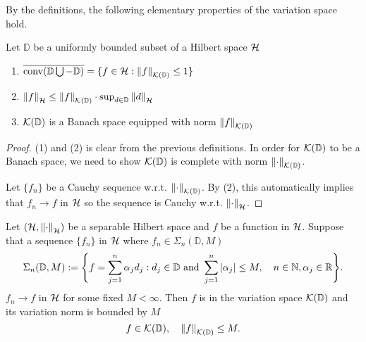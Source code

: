 By the definitions, the following elementary properties of the variation space
hold.
\begin{proposition}
    \label{prop:spaceVar_properties}
    Let $\mathbb{D}$ be a uniformly bounded subset of a Hilbert space $\mathcal{H}$
    \begin{enumerate}
        \item $\overline{\operatorname*{conv}(\mathbb{D} \bigcup - \mathbb{D})} = \{
            f\in\mathcal{H}: \left\| {f} \right\|_{\mathcal{K}({\mathbb{D}})} \leq 1
        \}$
        \item $\left\| f \right\|_{\mathcal{H}} \leq \left\| {f} \right\|_{\mathcal{K}({\mathbb{D}})} \cdot
        \sup_{d\in\mathbb{D}} \left\| d \right\|_{\mathcal{H}}$
        \item $\mathcal{K}({\mathbb{D}})$ is a Banach space equipped with norm
        $\left\| {f} \right\|_{\mathcal{K}({\mathbb{D}})}$
    \end{enumerate}
\end{proposition}

\begin{proof}
    (1) and (2) is clear from the previous definitions. In order for
    $\mathcal{K}({\mathbb{D}})$ to be a Banach space, we need to show
    $\mathcal{K}({\mathbb{D}})$ is complete with norm $\left\| {\cdot} \right\|_{\mathcal{K}({\mathbb{D}})}$.

    Let $\{f_n\}$ be a Cauchy sequence w.r.t. $\left\| {\cdot} \right\|_{\mathcal{K}({\mathbb{D}})}$. By
    (2), this automatically implies that $f_n \to f$ in $\mathcal{H}$ so the
    sequence is Cauchy w.r.t. $\left\| \cdot \right\|_{\mathcal{H}}$.
\end{proof}


\begin{proposition}
    Let $(\mathcal{H}, \left\| \cdot \right\|_{\mathcal{H}})$ be a separable Hilbert space and
    $f$ be a function in $\mathcal{H}$. Suppose that a sequence $\{f_n\}$ in
    $\mathcal{H}$ where $f_n \in \Sigma_{n}(\mathbb{D}, M)$
    \begin{equation}
        \Sigma_n(\mathbb{D}, M) := \Bigg\{
            f = \sum_{j=1}^n \alpha_j d_j: 
            d_j \in \mathbb{D} \textnormal{ and } 
            \sum_{j=1}^n \left| \alpha_j \right| \leq M, \quad 
            n \in \mathbb{N}, \alpha_j \in \mathbb{R}
        \Bigg\}.
    \end{equation}
    $f_n \to f$ in $\mathcal{H}$ for some fixed $M < \infty$. Then $f$ is in the
    variation space $\mathcal{K}({\mathbb{D}})$ and its variation norm is bounded by
    $M$
    \begin{equation}
        f \in \mathcal{K}({\mathbb{D}}), \quad \left\| {f} \right\|_{\mathcal{K}({\mathbb{D}})}\leq M.
    \end{equation}
\end{proposition}

